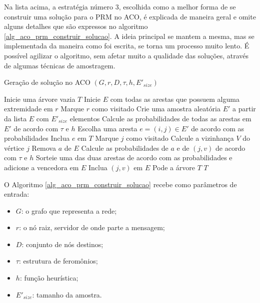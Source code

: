 Na lista acima, a estratégia número 3, escolhida como a melhor forma de se construir uma solução para o PRM no ACO, é explicada de maneira geral e omite alguns detalhes que são expressos no algoritmo \ref{alg_aco_prm_construir_solucao}. A ideia principal se mantem a mesma, mas se implementada da maneira como foi escrita, se torna um processo muito lento. É possível agilizar o algoritmo, sem afetar muito a qualidade das soluções, através de algumas técnicas de amostragem.

\begin{algorithm}
	\caption{Geração de solução no ACO $(G, r, D, \tau, h, E'_{size})$}
	\label{alg_aco_prm_construir_solucao}
	\begin{algorithmic}[1]
		\State Inicie uma árvore vazia $T$
		\State Inicie $E$ com todas as arestas que possuem alguma extremidade em $r$
		\State Marque $r$ como visitado
			\State Crie uma amostra aleatória $E'$ a partir da lista $E$ com $E'_{size}$ elementos
			\State Calcule as probabilidades de todas as arestas em $E'$ de acordo com $\tau$ e $h$
			\State Escolha uma aresta $e=(i,j) \in E'$ de acordo com as probabilidades
			\State Inclua $e$ em $T$
			\State Marque $j$ como visitado
			\State Calcule a vizinhança $V$ do vértice $j$
					\State Remova $a$ de $E$
					\State Calcule as probabilidades de $a$ e de $(j, v)$ de acordo com $\tau$ e $h$
					\State Sorteie uma das duas arestas de acordo com as probabilidades e adicione a vencedora em $E$
					\State Inclua $(j, v)$ em $E$
				\EndIf
			\EndFor
		\EndWhile
		\State Pode a árvore $T$
		\State \Return $T$
	\end{algorithmic}
\end{algorithm}

O Algoritmo \ref{alg_aco_prm_construir_solucao} recebe como parâmetros de entrada:

\begin{itemize}
	\item $G$: o grafo que representa a rede;
	\item $r$: o nó raiz, servidor de onde parte a mensagem;
	\item $D$: conjunto de nós destinos;
	\item $\tau$: estrutura de feromônios;
	\item $h$: função heurística;
	\item $E'_{size}$: tamanho da amostra.
\end{itemize}

